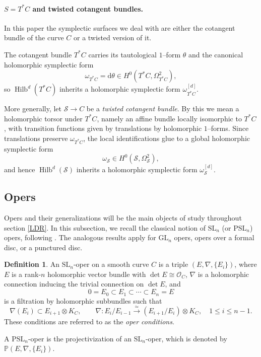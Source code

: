 \documentclass[twoside, 11pt]{article}
\numberwithin{equation}{section}
\theoremstyle{theorem}
\numberwithin{theorem}{section}
\theoremstyle{definition}
\newtheorem{definition}[definition]{Definition}
\begin{document}
\paragraph{$S=T^\ast C$ and twisted cotangent bundles.}
In this paper the symplectic surfaces we deal with are either the cotangent bundle of the curve $C$ or a twisted version of it. 

\smallskip
The cotangent bundle $T^\ast C$ carries its tautological $1$--form $\theta$ and the canonical holomorphic symplectic form
\[
\omega_{T^\ast C}= \mathrm{d}\theta \in H^0(T^\ast C,\Omega_{T^\ast C}^2),
\]
so $\operatorname{Hilb}^d(T^\ast C)$ inherits a holomorphic symplectic form $\omega_{T^\ast C}^{[d]}$.

\smallskip
More generally, let $\mathcal{S}\to C$ be a \emph{twisted cotangent bundle}. By this we mean a holomorphic torsor under $T^\ast C$, namely an affine bundle locally isomorphic to $T^\ast C$, with transition functions given by translations by holomorphic $1$--forms. Since translations preserve $\omega_{T^\ast C}$, the local identifications glue to a global holomorphic symplectic form
\[
\omega_{\mathcal{S}}\in H^0(\mathcal{S},\Omega_{\mathcal{S}}^2),
\]
and hence $\operatorname{Hilb}^d(\mathcal{S})$ inherits a holomorphic symplectic form $\omega_{\mathcal{S}}^{[d]}$.


\subsection{Opers}
Opers and their generalizations will be the main objects of study throughout section \ref{LDR}. In this subsection, we recall the classical notion of $\mathrm{SL}_n$ (or $\mathrm{PSL}_n$) opers, following \cite{We15, BD05}. The analogous results apply for $\mathrm{GL}_n$ opers, opers over a formal disc, or a punctured disc. 

\begin{definition}
An $\mathrm{SL}_n$-oper on a smooth curve $C$ is a triple $(E,\nabla,\{E_i\})$, where $E$ is a rank-$n$ holomorphic vector bundle with $\det E \cong \mathcal O_C$, $\nabla$ is a holomorphic connection inducing the trivial connection on $\det E$, and
\[
0=E_0\subset E_1\subset \cdots \subset E_n=E
\]
is a filtration by holomorphic subbundles such that
\[
\nabla(E_i)\subset E_{i+1}\otimes K_C,
\qquad
\nabla: E_i/E_{i-1}\xrightarrow{\simeq}(E_{i+1}/E_i)\otimes K_C,
\quad 1\le i\le n-1.
\]
These conditions are referred to as the \emph{oper conditions}.

A $\mathrm{PSL}_n$-oper is the projectivization of an $\mathrm{SL}_n$-oper, which is denoted by $\mathbb P(E,\nabla,\{E_i\})$. 
\end{definition}
\end{document}
